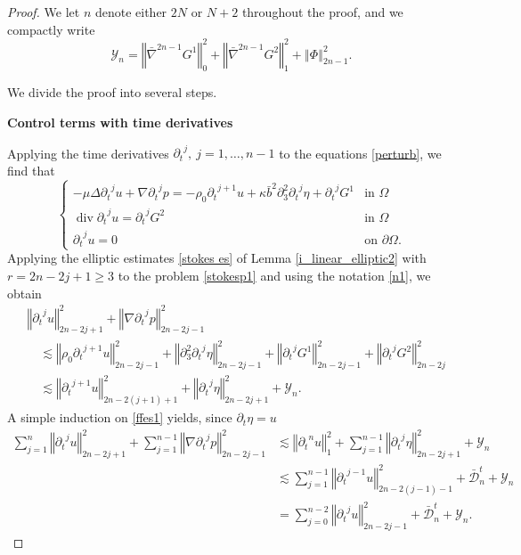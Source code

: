 \documentclass[a4paper,reqno,11pt]{amsart}
\numberwithin{equation}{section}
\providecommand{\norm}[1]{\left\Vert#1\right\Vert}
\providecommand{\ns}[1]{\norm{#1}^2}
\providecommand{\norm}[1]{\left\Vert#1\right\Vert}
\begin{document}
\begin{proof}
We let $n$ denote either $2N$ or $N+2$ throughout the proof, and we compactly write
\begin{equation}\label{n1}
 \mathcal{Y}_n =  \ns{ \bar{\nabla}^{2n-1} G^1}_{0}  +  \ns{ \bar{\nabla}^{2n-1}  G^2}_{1} +  \ns{   \Phi}_{2n-1}  .
\end{equation}

We divide the proof into several steps.

{\bf Control terms with time derivatives}

Applying the time derivatives ${\partial_t}^{j},\ j=1,\dots,n-1$ to the equations \eqref{perturb}, we find that
\begin{equation}\label{stokesp1}
\begin{cases}
-\mu\Delta {\partial_t}^{j} u+\nabla {\partial_t}^{j} p =-\rho_0{\partial_t}^{j+1} u+\kappa\bar b^2 {\partial}_{3}^2 {\partial_t}^{j}\eta+{\partial_t}^{j} G^1& \text{in }
\Omega
\\ \operatorname{div} {\partial_t}^{j} u={\partial_t}^{j} G^2 & \text{in }
\Omega
\\ {\partial_t}^{j} u=0 &\text{on }{\partial}\Omega.
\end{cases}
\end{equation}
Applying the elliptic estimates \eqref{stokes es} of Lemma \ref{i_linear_elliptic2} with $r=2n-2j+1\ge 3$ to the problem \eqref{stokesp1} and using the notation \eqref{n1}, we obtain
\begin{equation}\label{ffes1}
\begin{split}
 &\norm{{\partial_t}^j  u  }_{2n-2j+1}^2 + \norm{{\nabla} {\partial_t}^j  p  }_{2n-2j-1}^2
 \\  &\quad{\lesssim}
\norm{\rho_0{\partial_t}^{j+1} u   }_{2n-2j-1 }^2+\norm{ {\partial}_{3}^2 {\partial_t}^{j }\eta}_{2n-2j-1 }^2+ \norm{ {\partial_t}^j G^1   }_{2n-2j-1}^2
+ \norm{{\partial_t}^j  G^2  }_{2n-2j}^2
\\&\quad{\lesssim}   \norm{{\partial_t}^{j+1} u   }_{2n-2(j+1)+1 }^2 + \norm{{\partial_t}^{j }\eta  }_{2n-2 j +1 }^2 +  {\mathcal{Y}}_n.
\end{split}
\end{equation}
A simple induction on \eqref{ffes1} yields, since ${\partial_t} \eta=u$
\begin{equation}\label{eses11}
\begin{split}
  \sum_{j=1}^{n}\norm{ {\partial_t}^j u  }_{2n-2j+1}^2+  \sum_{j=1}^{n-1}\norm{{\nabla} {\partial_t}^j  p  }_{2n-2j-1}^2
 & {\lesssim} \ns{{\partial_t}^{n} u}_{1}+ \sum_{j=1}^{n-1}\norm{{\partial_t}^{j }\eta  }_{2n-2 j +1 }^2   +{\mathcal{Y}}_n
\\&   {\lesssim}   \sum_{j=1}^{n-1}\norm{{\partial_t}^{j-1} u   }_{2n-2(j-1)-1 }^2 + \bar{\mathcal{D}}_n^t+{\mathcal{Y}}_n
\\&  = \sum_{j=0}^{n-2}\norm{{\partial_t}^{j } u   }_{2n-2j-1 }^2   +\bar{\mathcal{D}}_n^t+ {\mathcal{Y}}_n.
\end{split}
\end{equation}


\end{proof}
\end{document}
